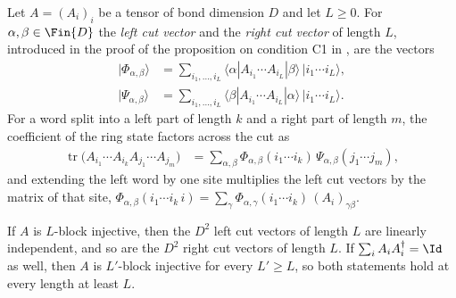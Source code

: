 \begin{definition}
    \label{def:pgvwc07_cut_vectors}
    \leanok
    Let $A=(A_i)_i$ be a tensor of bond dimension $D$ and let $L\ge0$. For
    $\alpha,\beta\in\Fin{D}$ the \emph{left cut vector} and the \emph{right
        cut vector} of length $L$, introduced in the proof of the proposition on
    condition C1 in \cite{PerezGarcia2007Matrix}, are the vectors
    \begin{align}
        \lvert\Phi_{\alpha,\beta}\rangle
         & =\sum_{i_1,\ldots,i_L}\langle\alpha|A_{i_1}\cdots A_{i_L}|\beta\rangle
        \,\lvert i_1\cdots i_L\rangle,
        \label{eq:pgvwc07_left_cut_vector}                                        \\
        \lvert\Psi_{\alpha,\beta}\rangle
         & =\sum_{i_1,\ldots,i_L}\langle\beta|A_{i_1}\cdots A_{i_L}|\alpha\rangle
        \,\lvert i_1\cdots i_L\rangle.
        \label{eq:pgvwc07_right_cut_vector}
    \end{align}
    For a word split into a left part of length $k$ and a right part of
    length $m$, the coefficient of the ring state factors across the cut as
    \begin{align}
        \operatorname{tr}\bigl(A_{i_1}\cdots A_{i_k}A_{j_1}\cdots A_{j_m}\bigr)
         & =\sum_{\alpha,\beta}\Phi_{\alpha,\beta}(i_1\cdots i_k)\,
        \Psi_{\alpha,\beta}(j_1\cdots j_m),
        \label{eq:pgvwc07_cut_resolution}
    \end{align}
    and extending the left word by one site multiplies the left cut vectors
    by the matrix of that site,
    $\Phi_{\alpha,\beta}(i_1\cdots i_k\,i)
        =\sum_\gamma\Phi_{\alpha,\gamma}(i_1\cdots i_k)\,(A_i)_{\gamma\beta}$.
\end{definition}

\begin{lemma}
    \label{lem:pgvwc07_cut_vectors_linearIndependent}
    \leanok
    If $A$ is $L$-block injective, then the $D^2$ left cut vectors of length
    $L$ are linearly independent, and so are the $D^2$ right cut vectors of
    length $L$. If $\sum_iA_iA_i^\dagger=\Id$ as well, then $A$ is
    $L'$-block injective for every $L'\ge L$, so both statements hold at
    every length at least $L$.
\end{lemma}


